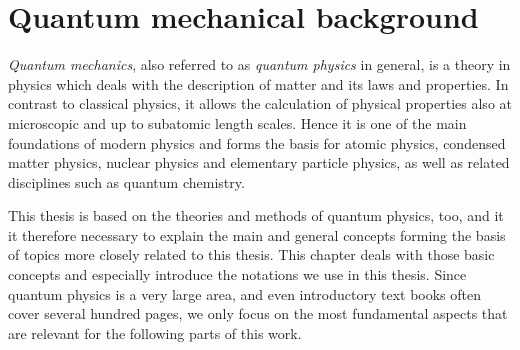 \chapter{Quantum mechanical background}
\label{chap:theory}

\textit{Quantum mechanics}, also referred to as \textit{quantum physics} in general, is a theory in physics which deals with the description of matter and its laws and properties. In contrast to classical physics, it allows the calculation of physical properties also at microscopic and up to subatomic length scales. Hence it is one of the main foundations of modern physics and forms the basis for atomic physics, condensed matter physics, nuclear physics and elementary particle physics, as well as related disciplines such as quantum chemistry.

This thesis is based on the theories and methods of quantum physics, too, and it it therefore necessary to explain the main and general concepts forming the basis of topics  more closely related to this thesis. This chapter deals with those basic concepts and especially introduce the notations we use in this thesis. Since quantum physics is a very large area, and even introductory text books often cover several hundred pages, we only focus on the most fundamental aspects that are relevant for the following parts of this work.

